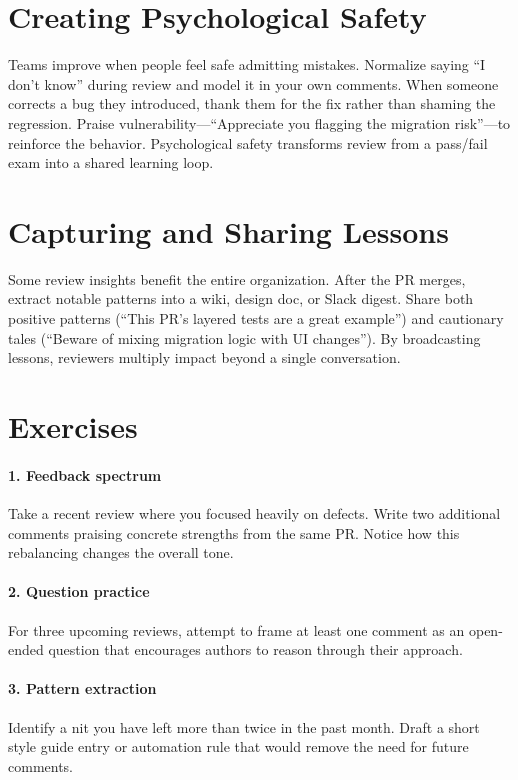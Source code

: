\section{Creating Psychological Safety}
Teams improve when people feel safe admitting mistakes. Normalize saying ``I don't know'' during review and model it in your own comments. When someone corrects a bug they introduced, thank them for the fix rather than shaming the regression. Praise vulnerability---``Appreciate you flagging the migration risk''---to reinforce the behavior. Psychological safety transforms review from a pass/fail exam into a shared learning loop.

\section{Capturing and Sharing Lessons}
Some review insights benefit the entire organization. After the PR merges, extract notable patterns into a wiki, design doc, or Slack digest. Share both positive patterns (``This PR's layered tests are a great example'') and cautionary tales (``Beware of mixing migration logic with UI changes''). By broadcasting lessons, reviewers multiply impact beyond a single conversation.

\section*{Exercises}

\paragraph{1. Feedback spectrum} Take a recent review where you focused heavily on defects. Write two additional comments praising concrete strengths from the same PR. Notice how this rebalancing changes the overall tone.

\paragraph{2. Question practice} For three upcoming reviews, attempt to frame at least one comment as an open-ended question that encourages authors to reason through their approach.

\paragraph{3. Pattern extraction} Identify a nit you have left more than twice in the past month. Draft a short style guide entry or automation rule that would remove the need for future comments.

